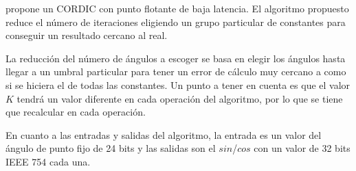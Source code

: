 \cite{nguyen_low-resource_2015} propone un CORDIC con punto flotante de baja latencia. El algoritmo propuesto reduce el número de iteraciones eligiendo un grupo particular de constantes para conseguir un resultado cercano al real.

La reducción del número de ángulos a escoger se basa en elegir los ángulos hasta llegar a un umbral particular para tener un error de cálculo muy cercano a como si se hiciera el de todas las constantes. Un punto a tener en cuenta es que el valor $K$ tendrá un valor diferente en cada operación del algoritmo, por lo que se tiene que recalcular en cada operación.

En cuanto a las entradas y salidas del algoritmo, la entrada es un valor del ángulo de punto fijo de 24 bits y las salidas son el $sin$/$cos$ con un valor de 32 bits IEEE 754 cada una.

\begin{table}[]
	\centering
	\caption{Tabla de comparaciones del CORDIC propuesto con otros trabajos parecidos. Tabla de \cite{nguyen_low-resource_2015}}
\label{graf:2015_low-latency-fp}
\end{table}


